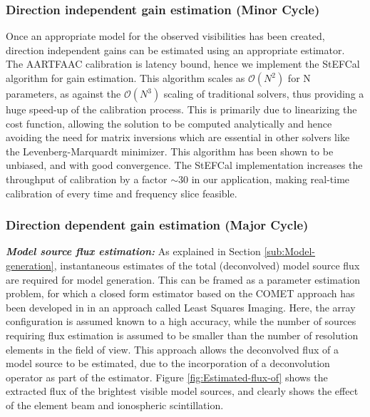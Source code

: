 \documentclass{aa}
\begin{document}
\subsubsection{\label{sub:Direction-independent-gain}Direction independent gain
estimation (Minor Cycle)}

Once  an appropriate  model  for  the observed  visibilities  has been  created,
direction independent gains can be estimated using an appropriate estimator. The
AARTFAAC   calibration    is   latency    bound,   hence   we    implement   the
StEFCal\citep{salvini2013stef}  algorithm for  gain estimation.   This algorithm
scales   as   $\mathcal{O}(N^{2})$   for    N   parameters,   as   against   the
$\mathcal{O}(N^{3})$  scaling  of traditional  solvers,  thus  providing a  huge
speed-up of the  calibration process.  This is primarily  due to linearizing the
cost  function, allowing  the solution  to  be computed  analytically and  hence
avoiding the  need for  matrix inversions which  are essential in  other solvers
like  the Levenberg-Marquardt  minimizer. This  algorithm has  been shown  to be
unbiased, and  with good convergence.  The StEFCal implementation  increases the
throughput  of calibration  by  a  factor $\sim$30  in  our application,  making
real-time calibration of every time and frequency slice feasible.


\subsubsection{\label{sub:Direction-dependent-gain}Direction dependent gain estimation
(Major Cycle)}

\textbf{\emph{Model   source  flux   estimation:}}  As   explained   in  Section
\ref{sub:Model-generation}, instantaneous  estimates of the  total (deconvolved)
model source  flux are required for model  generation.  This can be  framed as a
parameter estimation  problem, for  which a closed  form estimator based  on the
COMET  approach has  been  developed in  \citep{wijnholds2008fundamental} in  an
approach called Least Squares Imaging.  Here, the array configuration is assumed
known to a high accuracy, while  the number of sources requiring flux estimation
is assumed to be smaller than the  number of resolution elements in the field of
view.  This  approach allows  the  deconvolved  flux of  a  model  source to  be
estimated, due to  the incorporation of a deconvolution operator  as part of the
estimator. Figure  \ref{fig:Estimated-flux-of} shows  the extracted flux  of the
brightest visible  model sources,  and clearly shows  the effect of  the element
beam and ionospheric scintillation.
\end{document}

